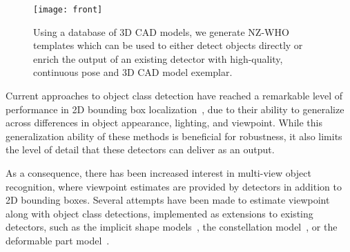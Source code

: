 \begin{figure}[t]
  \centering
  \texttt{[image: front]} %
  \caption{Using a database of 3D CAD models, we generate NZ-WHO
    templates which can be used to either detect objects directly or
    enrich the output of an existing detector with high-quality,
    continuous pose and 3D CAD model exemplar.}
  \label{fig:front}
\end{figure}
 

Current approaches to object class detection have reached a remarkable
level of performance in 2D bounding box
localization~\cite{pascal12, Felzenszwalb10, Overfeat, Krizhevsky12, Girshick14}, due to their
ability to generalize across differences in object appearance,
lighting, and viewpoint. While this generalization
ability of these methods is beneficial for robustness, it also limits
the level of detail that these detectors can deliver as an output.

As a consequence, there has been increased interest in multi-view object
recognition, where viewpoint estimates are provided by
detectors in addition to 2D bounding boxes. Several attempts have been
made to estimate viewpoint along with object class detections,
implemented as extensions to existing detectors, such as the implicit
shape models~\cite{sun10eccv}, the constellation model~\cite{stark10bmvc}, or the
deformable part model~\cite{Felzenszwalb10, gu10eccv,Xiang12,Pepik12,Fidler12,Hejrati14}.


